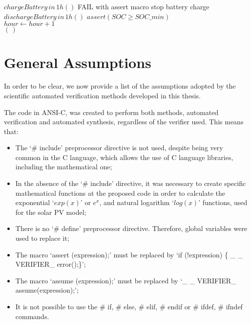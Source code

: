 \begin{algorithm}
\begin{algorithmic}[1]
\begin{scriptsize}
      \STATE $chargeBattery \, in \, 1h()$ 
      \STATE FAIL with assert macro 
      \STATE stop battery charge 
      \STATE $dischargeBattery \, in \, 1h()$ 
    \ENDIF
    \STATE $assert (SOC \geq SOC \_ min)$ \\
    \STATE $hour \leftarrow hour+1$ \\
   \ENDFOR
  \ENDFOR
 \RETURN $(\,)$ 
  \end{scriptsize}
 \end{algorithmic} 
 \label{alg:verification-algorithm}
 \end{algorithm}

%

\section{General Assumptions}
\label{sec:assumptions}

In order to be clear, we now provide a list of the assumptions adopted by the scientific automated verification methods developed in this thesis.

The code in ANSI-C, was created to perform both methods, automated verification and automated synthesis, regardless of the verifier used. This means that: 

\begin{itemize}
\item The `\# include' preprocessor directive is not used, despite being very common in the C language, which allows the use of C language libraries, including the mathematical one;
\item In the absence of the `\# include' directive, it was necessary to create specific mathematical functions at the proposed code in order to calculate the exponential `$exp(x)$' or $e^{x}$, and natural logarithm `$log(x)$' functions, used for the solar PV model;
\item There is no `\# define' preprocessor directive. Therefore, global variables were used to replace it;
\item The macro `assert (expression);' must be replaced by `if (!expression) \{ \_ \_ VERIFIER\_ error();\}';
\item The macro `assume (expression);' must be replaced by `\_ \_ VERIFIER\_ assume(expression);';
\item It is not possible to use the \# if, \# else, \# elif, \# endif or \# ifdef, \# ifndef commands.
\end{itemize}

